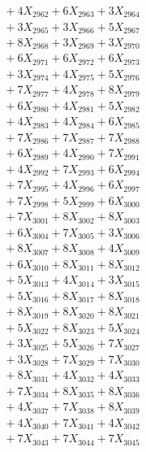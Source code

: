 \documentclass[a4paper,10pt]{article}
\begin{document}
{\begin{align}
&\;  + 4 X_{2962} + 6 X_{2963} + 3 X_{2964} \\[0.3ex]
&\;  + 3 X_{2965} + 3 X_{2966} + 5 X_{2967} \\[0.3ex]
&\;  + 8 X_{2968} + 3 X_{2969} + 3 X_{2970} \\[0.3ex]
&\;  + 6 X_{2971} + 6 X_{2972} + 6 X_{2973} \\[0.3ex]
&\;  + 3 X_{2974} + 4 X_{2975} + 5 X_{2976} \\[0.3ex]
&\;  + 7 X_{2977} + 4 X_{2978} + 8 X_{2979} \\[0.5ex]\allowbreak
&\;  + 6 X_{2980} + 4 X_{2981} + 5 X_{2982} \\[0.3ex]
&\;  + 4 X_{2983} + 4 X_{2984} + 6 X_{2985} \\[0.3ex]
&\;  + 7 X_{2986} + 7 X_{2987} + 7 X_{2988} \\[0.3ex]
&\;  + 6 X_{2989} + 4 X_{2990} + 7 X_{2991} \\[0.3ex]
&\;  + 4 X_{2992} + 7 X_{2993} + 6 X_{2994} \\[0.3ex]
&\;  + 7 X_{2995} + 4 X_{2996} + 6 X_{2997} \\[0.3ex]
&\;  + 7 X_{2998} + 5 X_{2999} + 6 X_{3000} \\[0.3ex]
&\;  + 7 X_{3001} + 8 X_{3002} + 8 X_{3003} \\[0.3ex]
&\;  + 6 X_{3004} + 7 X_{3005} + 3 X_{3006} \\[0.3ex]
&\;  + 8 X_{3007} + 8 X_{3008} + 4 X_{3009} \\[0.5ex]\allowbreak
&\;  + 6 X_{3010} + 8 X_{3011} + 8 X_{3012} \\[0.3ex]
&\;  + 5 X_{3013} + 4 X_{3014} + 3 X_{3015} \\[0.3ex]
&\;  + 5 X_{3016} + 8 X_{3017} + 8 X_{3018} \\[0.3ex]
&\;  + 8 X_{3019} + 8 X_{3020} + 8 X_{3021} \\[0.3ex]
&\;  + 5 X_{3022} + 8 X_{3023} + 5 X_{3024} \\[0.3ex]
&\;  + 3 X_{3025} + 5 X_{3026} + 7 X_{3027} \\[0.3ex]
&\;  + 3 X_{3028} + 7 X_{3029} + 7 X_{3030} \\[0.3ex]
&\;  + 8 X_{3031} + 4 X_{3032} + 4 X_{3033} \\[0.3ex]
&\;  + 7 X_{3034} + 8 X_{3035} + 8 X_{3036} \\[0.3ex]
&\;  + 4 X_{3037} + 7 X_{3038} + 8 X_{3039} \\[0.5ex]\allowbreak
&\;  + 4 X_{3040} + 7 X_{3041} + 4 X_{3042} \\[0.3ex]
&\;  + 7 X_{3043} + 7 X_{3044} + 7 X_{3045} \\[0.3ex]

\end{align}}
\end{document}
